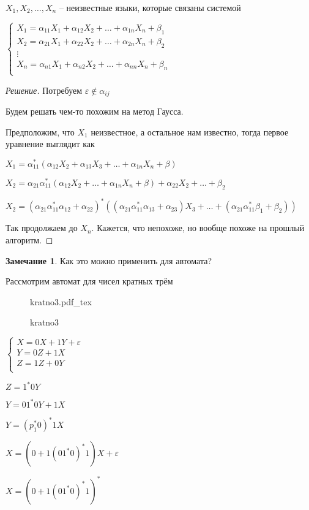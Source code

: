 \documentclass{book}
\theoremstyle{definition}
\newtheorem*{note}{Замечание}
\newcommand{\incfig}[1]{%
    \def\svgwidth{\columnwidth}
    {#1.pdf_tex}
}
\begin{document}
\begin{problem}
    $X_1, X_2, \ldots, X_n$ -- неизвестные языки, которые связаны системой

    $\begin{cases}
        X_1 = \alpha_{11}X_1 + \alpha_{12}X_2 + \ldots + \alpha_{1n} X_n +\beta_1\\
        X_2 = \alpha_{21}X_1 + \alpha_{22}X_2 + \ldots + \alpha_{2n} X_n +\beta_2\\
        \vdots\\
        X_n = \alpha_{n1}X_1 + \alpha_{n2}X_2 + \ldots + \alpha_{nn} X_n +\beta_n\\
    \end{cases}$
\end{problem}
\begin{proof}
    [Решение]

    Потребуем  $\varepsilon\not\in \alpha_{ij}$ 

    Будем решать чем-то похожим на метод Гаусса. 

    Предположим, что $X_1$ неизвестное, а остальное нам известно, тогда первое уравнение выглядит как

    $X_1 = \alpha_{11}^*\left( \alpha_{12}X_2 + \alpha_{13}X_3 + \ldots + \alpha_{1n}X_n + \beta \right) $ 

    $X_2 = \alpha_{21}\alpha_{11}^*\left( \alpha_{12}X_2 + \ldots + \alpha_{1n}X_n + \beta \right)  + \alpha_{22}X_2 + \ldots + \beta_2$

    $X_2 = \left( \alpha_{21}\alpha_{11}^*\alpha_{12} + \alpha_{22} \right) ^*\left(\left( \alpha_{21}\alpha_{11}^*\alpha_{13}+\alpha_{23} \right)X_3+ \ldots + \left( \alpha_{21}\alpha_{11}^*\beta_1+\beta_2 \right)  \right)$

    Так продолжаем до $X_n$. Кажется, что непохоже, но вообще похоже на прошлый алгоритм.
\end{proof}

\begin{note}
    Как это можно применить для автомата?

    Рассмотрим автомат для чисел кратных трём

\begin{figure}[!ht]
    \centering
    \incfig{kratno3}
    \caption{kratno3}
    \label{fig:kratno3}
\end{figure}

    $\begin{cases}
        X = 0X + 1Y + \varepsilon\\
        Y = 0Z+1X\\
        Z = 1Z+0Y\\
    \end{cases}$ 

    $Z = 1^*0Y$

     $Y = 01^*0Y+1X$

     $Y = \left( p_1^*0 \right) ^*1X$

     $X = \left( 0 + 1\left( 01^*0 \right) ^*1 \right) X+\varepsilon$

     $X = \left( 0 + 1\left( 01^*0 \right) ^*1  \right) ^*$
\end{note}
\end{document}
